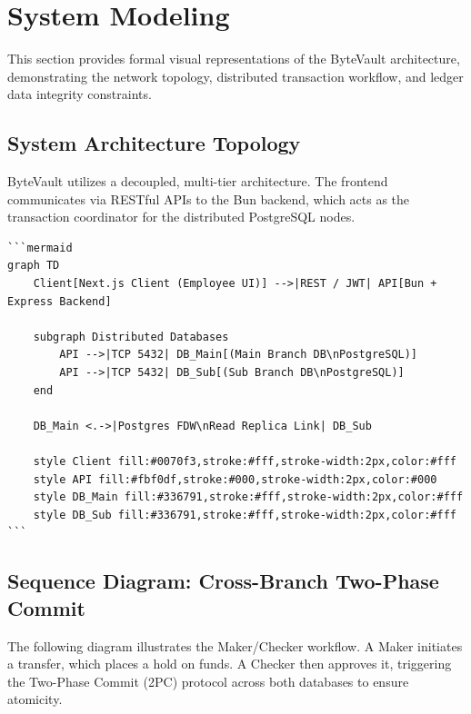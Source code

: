 \section{System Modeling}

This section provides formal visual representations of the ByteVault architecture, demonstrating the network topology, distributed transaction workflow, and ledger data integrity constraints.

\subsection{System Architecture Topology}

ByteVault utilizes a decoupled, multi-tier architecture. The frontend communicates via RESTful APIs to the Bun backend, which acts as the transaction coordinator for the distributed PostgreSQL nodes.

\begin{center}
\begin{verbatim}
```mermaid
graph TD
    Client[Next.js Client (Employee UI)] -->|REST / JWT| API[Bun + Express Backend]
    
    subgraph Distributed Databases
        API -->|TCP 5432| DB_Main[(Main Branch DB\nPostgreSQL)]
        API -->|TCP 5432| DB_Sub[(Sub Branch DB\nPostgreSQL)]
    end
    
    DB_Main <.->|Postgres FDW\nRead Replica Link| DB_Sub
    
    style Client fill:#0070f3,stroke:#fff,stroke-width:2px,color:#fff
    style API fill:#fbf0df,stroke:#000,stroke-width:2px,color:#000
    style DB_Main fill:#336791,stroke:#fff,stroke-width:2px,color:#fff
    style DB_Sub fill:#336791,stroke:#fff,stroke-width:2px,color:#fff
```
\end{verbatim}
\end{center}

\subsection{Sequence Diagram: Cross-Branch Two-Phase Commit}

The following diagram illustrates the Maker/Checker workflow. A Maker initiates a transfer, which places a hold on funds. A Checker then approves it, triggering the Two-Phase Commit (2PC) protocol across both databases to ensure atomicity.

